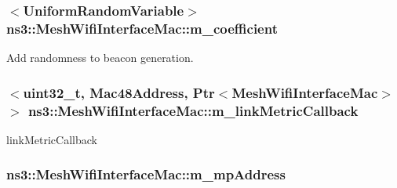 \subsubsection[{\texorpdfstring{m\+\_\+coefficient}{m_coefficient}}]{$<${\bf Uniform\+Random\+Variable}$>$ ns3\+::\+Mesh\+Wifi\+Interface\+Mac\+::m\+\_\+coefficient\hspace{0.3cm}{\ttfamily [private]}}\hypertarget{classns3_1_1MeshWifiInterfaceMac_af59873849b93cee1429ab81ac93d58a1}{}\label{classns3_1_1MeshWifiInterfaceMac_af59873849b93cee1429ab81ac93d58a1}


Add randomness to beacon generation. 

\subsubsection[{\texorpdfstring{m\+\_\+link\+Metric\+Callback}{m_linkMetricCallback}}]{$<$uint32\+\_\+t, {\bf Mac48\+Address}, {\bf Ptr}$<${\bf Mesh\+Wifi\+Interface\+Mac}$>$ $>$ ns3\+::\+Mesh\+Wifi\+Interface\+Mac\+::m\+\_\+link\+Metric\+Callback\hspace{0.3cm}{\ttfamily [private]}}\hypertarget{classns3_1_1MeshWifiInterfaceMac_a618f4cf314716f9b006ff39f37553c5a}{}\label{classns3_1_1MeshWifiInterfaceMac_a618f4cf314716f9b006ff39f37553c5a}
link\+Metric\+Callback 
\subsubsection[{\texorpdfstring{m\+\_\+mp\+Address}{m_mpAddress}}]{ ns3\+::\+Mesh\+Wifi\+Interface\+Mac\+::m\+\_\+mp\+Address\hspace{0.3cm}{\ttfamily [private]}}\hypertarget{classns3_1_1MeshWifiInterfaceMac_a268937434a33acb600cd45d4163eba32}{}\label{classns3_1_1MeshWifiInterfaceMac_a268937434a33acb600cd45d4163eba32}


